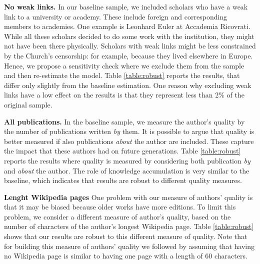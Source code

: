 \textbf{No weak links.} In our baseline sample, we included scholars who have a weak link to a university or academy. These include foreign and corresponding members to academies. One example is Leonhard Euler at Accademia Ricovrati. While all these scholars decided to do some work with the institution, they might not have been there physically. Scholars with weak links might be less constrained by the Church's censorship: for example, because they lived elsewhere in Europe. Hence, we propose a sensitivity check where we exclude them from the sample and then re-estimate the model. Table \ref{table:robust} reports the results, that differ only slightly from the baseline estimation. One reason why excluding weak links have a low effect on the results is that they represent less than $2\%$ of the original sample.

\textbf{All publications.} In the baseline sample, we measure the author's quality by the number of publications written \textit{by} them. It is possible to argue that quality is better measured if also publications \textit{about} the author are included. These capture the impact that these authors had on future generations. Table \ref{table:robust} reports the results where quality is measured by considering both publication \textit{by} and \textit{about} the author. The role of knowledge accumulation is very similar to the baseline, which indicates that results are robust to different quality measures.

\textbf{Lenght Wikipedia pages} One problem with our measure of authors' quality is that it may be biased because older works have more editions. To limit this problem, we consider a different measure of author’s quality, based on the number of characters of the author's longest Wikipedia page. Table \ref{table:robust} shows that our results are robust to this different measure of quality. Note that for building this measure of authors' quality we followed  by assuming that having no Wikipedia page is similar to having one page with a length of 60 characters.

